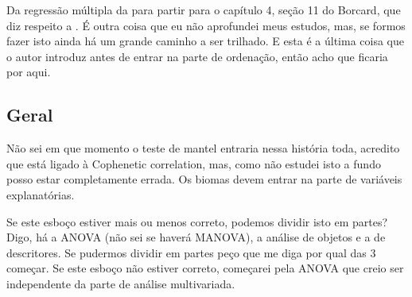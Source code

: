 Da regressão múltipla da para partir para o capítulo 4, seção 11 do Borcard, que diz respeito a . É outra coisa que eu não aprofundei meus estudos, mas, se formos fazer isto ainda há um grande caminho a ser trilhado. E esta é a última coisa que o autor introduz antes de entrar na parte de ordenação, então acho que ficaria por aqui.

\subsection{Geral}

Não sei em que momento o teste de mantel entraria nessa história toda, acredito que está ligado à Cophenetic correlation, mas, como não estudei isto a fundo posso estar completamente errada. Os biomas devem entrar na parte de variáveis explanatórias.

Se este esboço estiver mais ou menos correto, podemos dividir isto em partes? Digo, há a ANOVA (não sei se haverá MANOVA), a análise de objetos e a de descritores. Se pudermos dividir em partes peço que me diga por qual das 3 começar. Se este esboço não estiver correto, começarei pela ANOVA que creio ser independente da parte de análise multivariada.